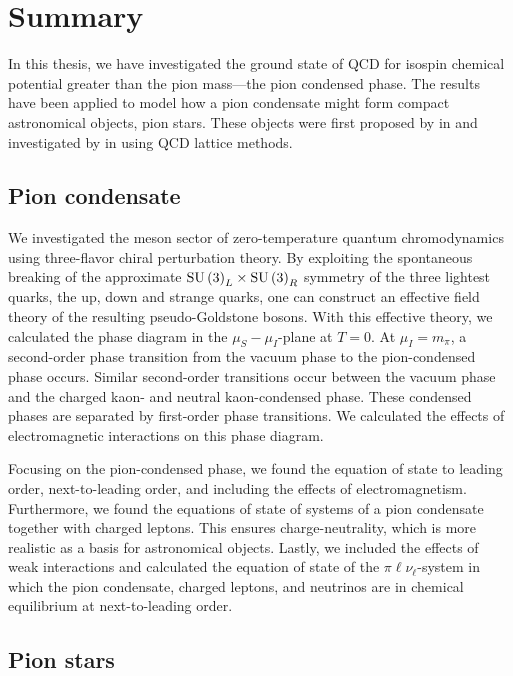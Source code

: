 \section{Summary}


In this thesis, we have investigated the ground state of QCD for isospin chemical potential greater than the pion mass---the pion condensed phase.
The results have been applied to model how a pion condensate might form compact astronomical objects, pion stars.
These objects were first proposed by \citeauthor{carignanoScrutinizingPionCondensed2017} in \autocite{carignanoScrutinizingPionCondensed2017} and investigated by \citeauthor{brandtNewClassCompact2018} in \autocite{brandtNewClassCompact2018} using QCD lattice methods.


\subsection{Pion condensate}

We investigated the meson sector of zero-temperature quantum chromodynamics using three-flavor chiral perturbation theory.
By exploiting the spontaneous breaking of the approximate $\text{SU}\left(3\right)_L\times\text{SU}\left(3\right)_R$ symmetry of the three lightest quarks, the up, down and strange quarks, one can construct an effective field theory of the resulting pseudo-Goldstone bosons.
With this effective theory, we calculated the phase diagram in the $\mu_S-\mu_I$-plane at $T = 0$.
At $\mu_I = m_\pi$, a second-order phase transition from the vacuum phase to the pion-condensed phase occurs.
Similar second-order transitions occur between the vacuum phase and the charged kaon- and neutral kaon-condensed phase.
These condensed phases are separated by first-order phase transitions.
We calculated the effects of electromagnetic interactions on this phase diagram.

Focusing on the pion-condensed phase, we found the equation of state to leading order, next-to-leading order, and including the effects of electromagnetism.
Furthermore, we found the equations of state of systems of a pion condensate together with charged leptons.
This ensures charge-neutrality, which is more realistic as a basis for astronomical objects.
Lastly, we included the effects of weak interactions and calculated the equation of state of the $\pi\ell\nu_\ell$-system in which the pion condensate, charged leptons, and neutrinos are in chemical equilibrium at next-to-leading order.


\subsection{Pion stars}


